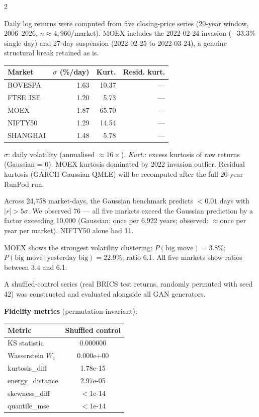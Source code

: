 \documentclass[10pt]{article}
\newcommand{\navybox}[2]{\begin{tcolorbox}[mybox={Navy}{LBg},title={#1}]#2\end{tcolorbox}}
\newcommand{\skybox}[2]{\begin{tcolorbox}[mybox={Sky}{BBg},title={#1}]#2\end{tcolorbox}}
\begin{document}
\begin{multicols}{2}

\navybox{BRICS Data Characteristics (Table~1)}{%
Daily log returns were computed from five closing-price series (20-year window, 2006--2026, $n\approx4{,}960$/market). MOEX includes the 2022-02-24 invasion ($-33.3\%$ single day) and 27-day suspension (2022-02-25 to 2022-03-24), a genuine structural break retained as is.

\smallskip
\begin{tabular}{@{}lrrr@{}}
\toprule
Market & $\sigma$ (\%/day) & Kurt. & Resid. kurt. \\
\midrule
BOVESPA    & 1.63 & 10.37 & --- \\
FTSE JSE   & 1.20 &  5.73 & --- \\
MOEX       & 1.87 & 65.70 & --- \\
NIFTY50    & 1.29 & 14.54 & --- \\
SHANGHAI   & 1.48 &  5.78 & --- \\
\bottomrule
\end{tabular}

\smallskip
\textit{$\sigma$}: daily volatility (annualised $\approx16\times$). \textit{Kurt.}: excess kurtosis of raw returns (Gaussian = 0). MOEX kurtosis dominated by 2022 invasion outlier. Residual kurtosis (GARCH Gaussian QMLE) will be recomputed after the full 20-year RunPod run.

Across 24,758 market-days, the Gaussian benchmark predicts $<0.01$ days with $|r|>5\sigma$. We observed 76 --- all five markets exceed the Gaussian prediction by a factor exceeding 10{,}000 (Gaussian: once per 6,922 years; observed: $\approx$once per year per market). NIFTY50 alone had 11.

MOEX shows the strongest volatility clustering: $P(\text{big move}) = 3.8\%$; $P(\text{big move}\,|\,\text{yesterday big}) = 22.9\%$; ratio 6.1. All five markets show ratios between 3.4 and 6.1.}

\skybox{Shuffled-Control Audit (Table~2)}{%
A shuffled-control series (real BRICS test returns, randomly permuted with seed 42) was constructed and evaluated alongside all GAN generators.

\smallskip
\textbf{Fidelity metrics} (permutation-invariant):
\begin{tabular}{@{}lc@{}}
\toprule
Metric & Shuffled control \\
\midrule
KS statistic         & 0.000000 \\
Wasserstein $W_1$    & 0.000e+00 \\
kurtosis\_diff       & 1.78e-15 \\
energy\_distance     & 2.97e-05 \\
skewness\_diff       & $<1\text{e-14}$ \\
quantile\_mse        & $<1\text{e-14}$ \\
\bottomrule
\end{tabular}

}
\end{multicols}
\end{document}
